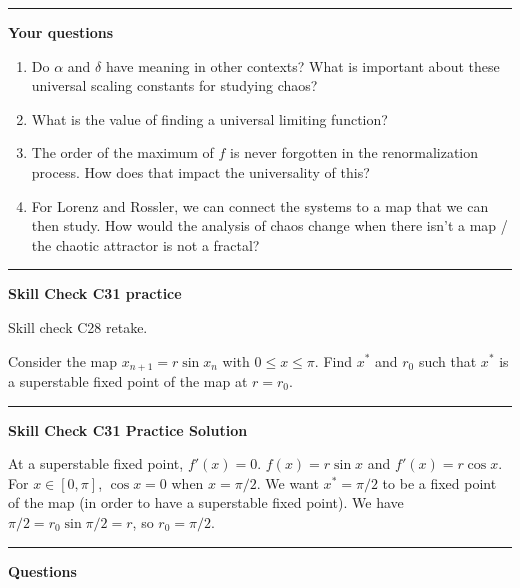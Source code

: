 \documentclass[12pt,letterpaper,noanswers]{exam}
\begin{document}
\vspace{0.2cm}
\hrule
\vspace{0.2cm}

\noindent\textbf{Your questions}
\begin{enumerate}
    \item Do $\alpha$ and $\delta$ have meaning in other contexts?  What is important about these universal scaling constants for studying chaos?
    \item What is the value of finding a universal limiting function?
    \item The order of the maximum of $f$ is never forgotten in the renormalization process. How does that impact the universality of this?
    \item For Lorenz and Rossler, we can connect the systems to a map that we can then study.  How would the analysis of chaos change when there isn't a map / the chaotic attractor is not a fractal?
\end{enumerate}


\vspace{0.2cm}
\hrule
\vspace{0.2cm}

\noindent\textbf{Skill Check C31 practice}
\begin{questions}
\item Skill check C28 retake.

\item Consider the map $x_{n+1} = r\sin x_n$ with $0\leq x \leq \pi$.  Find $x^*$ and $r_0$ such that $x^*$ is a superstable fixed point of the map at $r = r_0$.
\end{questions}

\vspace{0.2cm}

\hrule
\vspace{0.2cm}

\noindent\textbf{Skill Check C31 Practice Solution}

At a superstable fixed point, $f'(x) = 0$.  $f(x) = r\sin x$ and $f'(x) = r\cos x$.  For $x \in [0,\pi]$, $\cos x = 0$ when $x = \pi/2$.  We want $x^* = \pi/2$ to be a fixed point of the map (in order to have a superstable fixed point).  We have $\pi/2 = r_0\sin\pi/2 = r$, so $r_0 = \pi/2$.  


\vspace{0.2cm}

\hrule
\vspace{0.2cm}


\noindent\textbf{Questions}
\end{document}

